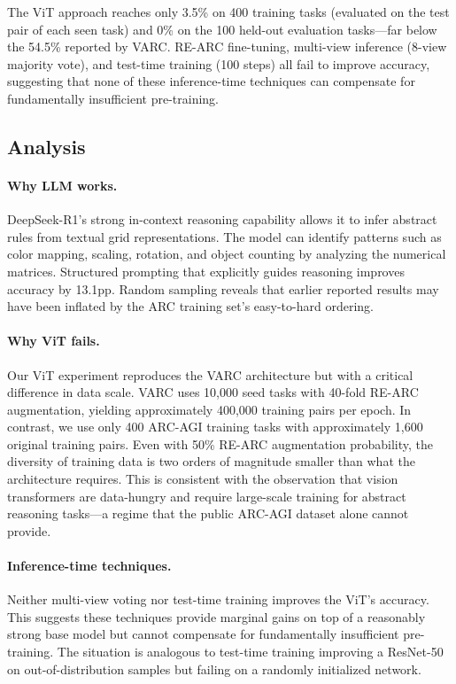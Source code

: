 \documentclass{article}
\begin{document}
The ViT approach reaches only 3.5\% on 400 training tasks (evaluated on the test pair of each seen task) and 0\% on the 100 held-out evaluation tasks---far below the 54.5\% reported by VARC. RE-ARC fine-tuning, multi-view inference (8-view majority vote), and test-time training (100 steps) all fail to improve accuracy, suggesting that none of these inference-time techniques can compensate for fundamentally insufficient pre-training.

\subsection{Analysis}

\paragraph{Why LLM works.} DeepSeek-R1's strong in-context reasoning capability allows it to infer abstract rules from textual grid representations. The model can identify patterns such as color mapping, scaling, rotation, and object counting by analyzing the numerical matrices. Structured prompting that explicitly guides reasoning improves accuracy by 13.1pp. Random sampling reveals that earlier reported results may have been inflated by the ARC training set's easy-to-hard ordering.

\paragraph{Why ViT fails.} Our ViT experiment reproduces the VARC architecture but with a critical difference in data scale. VARC uses 10,000 seed tasks with 40-fold RE-ARC augmentation, yielding approximately 400,000 training pairs per epoch. In contrast, we use only 400 ARC-AGI training tasks with approximately 1,600 original training pairs. Even with 50\% RE-ARC augmentation probability, the diversity of training data is two orders of magnitude smaller than what the architecture requires. This is consistent with the observation that vision transformers are data-hungry and require large-scale training for abstract reasoning tasks---a regime that the public ARC-AGI dataset alone cannot provide.

\paragraph{Inference-time techniques.} Neither multi-view voting nor test-time training improves the ViT's accuracy. This suggests these techniques provide marginal gains on top of a reasonably strong base model but cannot compensate for fundamentally insufficient pre-training. The situation is analogous to test-time training improving a ResNet-50 on out-of-distribution samples but failing on a randomly initialized network.
\end{document}
